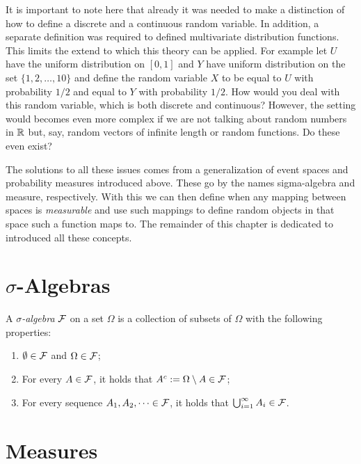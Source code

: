 It is important to note here that already it was needed to make a distinction of how to define a discrete and a continuous random variable. In addition, a separate definition was required to defined multivariate distribution functions. This limits the extend to which this theory can be applied. For example let $U$ have the uniform distribution on $[0,1]$ and $Y$ have uniform distribution on the set $\{1,2, \dots, 10\}$ and define the random variable $X$ to be equal to $U$ with probability $1/2$ and equal to $Y$ with probability $1/2$. How would you deal with this random variable, which is both discrete and continuous? However, the setting would becomes even more complex if we are not talking about random numbers in $\mathbb R$ but, say, random vectors of infinite length or random functions. Do these even exist?

The solutions to all these issues comes from a generalization of event spaces and probability measures introduced above. These go by the names sigma-algebra and measure, respectively. With this we can then define when any mapping between spaces is \emph{measurable} and use such mappings to define random objects in that space such a function maps to. The remainder of this chapter is dedicated to introduced all these concepts.


\section{$\sigma$-Algebras}


\begin{definition}\label{def:test1}
A \emph{$\sigma$-algebra} $\mathcal F$ on a set $\Omega$ is a collection of subsets of $\Omega$ with the following properties:
\begin{enumerate}
\item $\emptyset \in \mathcal F$ and $\Omega \in \mathcal F$;
\item For every $A \in \mathcal F$, it holds that $A^c := \Omega \setminus A \in \mathcal F$;
\item For every sequence $A_1, A_2, \dots \in \mathcal F$, it holds that $\bigcup_{i = 1}^\infty A_i \in \mathcal F$.
\end{enumerate}
\end{definition}





\section{Measures}

